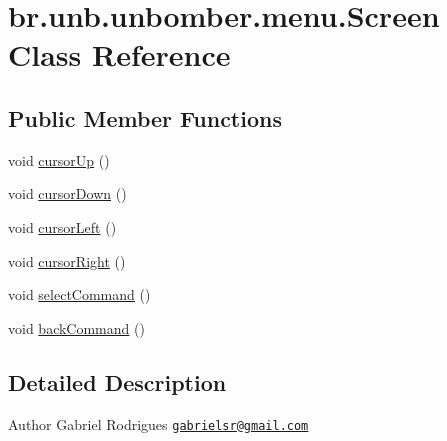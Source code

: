 \hypertarget{classbr_1_1unb_1_1unbomber_1_1menu_1_1_screen}{\section{br.\+unb.\+unbomber.\+menu.\+Screen Class Reference}
\label{classbr_1_1unb_1_1unbomber_1_1menu_1_1_screen}
}
\subsection*{Public Member Functions}
\begin{DoxyCompactItemize}
\item 
void \hyperlink{classbr_1_1unb_1_1unbomber_1_1menu_1_1_screen_aa6faba96bdecf5c6a657725f38cdece2}{cursor\+Up} ()
\item 
void \hyperlink{classbr_1_1unb_1_1unbomber_1_1menu_1_1_screen_a4fc429a341011a9b1293f8662e92123e}{cursor\+Down} ()
\item 
void \hyperlink{classbr_1_1unb_1_1unbomber_1_1menu_1_1_screen_a1f4ab7eb904c073c17b01230cdc2109e}{cursor\+Left} ()
\item 
void \hyperlink{classbr_1_1unb_1_1unbomber_1_1menu_1_1_screen_a4e34526e0932ca0d36cd690ef76966f2}{cursor\+Right} ()
\item 
void \hyperlink{classbr_1_1unb_1_1unbomber_1_1menu_1_1_screen_a07d781fe823f9633269201985c7b589d}{select\+Command} ()
\item 
void \hyperlink{classbr_1_1unb_1_1unbomber_1_1menu_1_1_screen_a7dc1fe37767ed5910d032facfda129b2}{back\+Command} ()
\end{DoxyCompactItemize}


\subsection{Detailed Description}
\begin{DoxyAuthor}{Author}
Gabriel Rodrigues \href{mailto:gabrielsr@gmail.com}{\tt gabrielsr@gmail.\+com} 
\end{DoxyAuthor}


